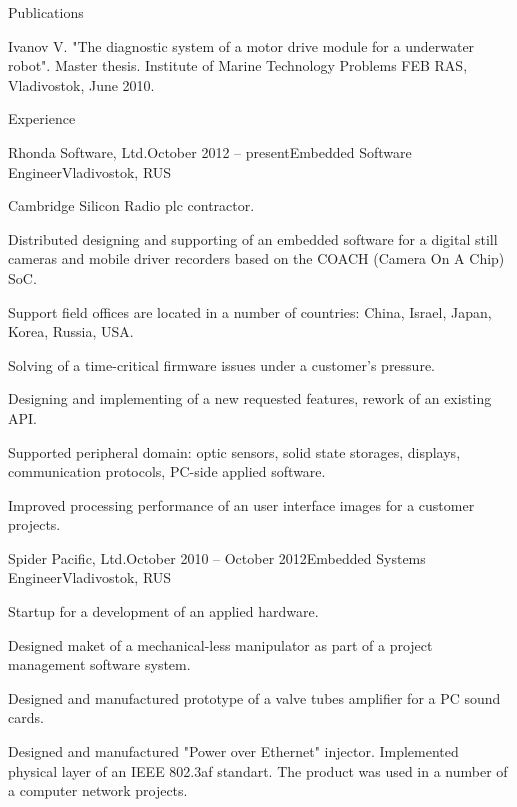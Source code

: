 \documentclass{template}
\begin{document}

\begin{rSection}{Publications}

\begin{rItemize}
\item Ivanov V. "The diagnostic system of a motor drive module for a underwater robot". Master thesis. Institute of Marine Technology Problems FEB RAS, Vladivostok, June 2010.
\end{rItemize}

\end{rSection}


\begin{rSection}{Experience}

\begin{rCompany}{Rhonda Software, Ltd.}{October 2012 -- present}{Embedded Software Engineer}{Vladivostok, RUS}
\item Cambridge Silicon Radio plc contractor.
\item Distributed designing and supporting of an embedded software for a digital still cameras and mobile driver recorders based on the COACH (Camera On A Chip) SoC.
\item Support field offices are located in a number of countries: China, Israel, Japan, Korea, Russia, USA.
\item Solving of a time-critical firmware issues under a customer's pressure.
\item Designing and implementing of a new requested features, rework of an existing API.
\item Supported peripheral domain: optic sensors, solid state storages, displays, communication protocols, PC-side applied software.
\item Improved processing performance of an user interface images for a customer projects.
\end{rCompany}

\begin{rCompany}{Spider Pacific, Ltd.}{October 2010 -- October 2012}{Embedded Systems Engineer}{Vladivostok, RUS}
\item Startup for a development of an applied hardware.
\item Designed maket of a mechanical-less manipulator as part of a project management software system.
\item Designed and manufactured prototype of a valve tubes amplifier for a PC sound cards.
\item Designed and manufactured "Power over Ethernet" injector. Implemented physical layer of an IEEE 802.3af standart. The product was used in a number of a computer network projects.
\end{rCompany}

\end{rSection}
\end{document}
